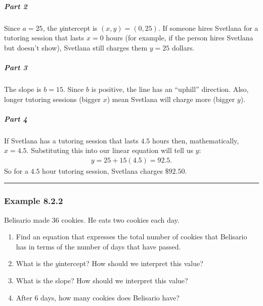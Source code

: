 \documentclass[letterpaper,10pt,english]{jupyterBook}
\begin{document}
\subparagraph{Part 2}
\label{\detokenize{Ch8 Correlation and Linear Regression/8.2 Linear Equations:part-2}}
\sphinxAtStartPar
Since \(a = 25\), the \(y\)\sphinxhyphen{}intercept is \((x, y) = (0, 25)\). If someone hires Svetlana for a tutoring session that lasts \(x = 0\) hours (for example, if the person hires Svetlana but doesn’t show), Svetlana still charges them \(y = 25\) dollars.


\subparagraph{Part 3}
\label{\detokenize{Ch8 Correlation and Linear Regression/8.2 Linear Equations:part-3}}
\sphinxAtStartPar
The slope is \(b = 15\). Since \(b\) is positive, the line has an “uphill” direction. Also, longer tutoring sessions (bigger \(x\)) mean Svetlana will charge more (bigger \(y\)).


\subparagraph{Part 4}
\label{\detokenize{Ch8 Correlation and Linear Regression/8.2 Linear Equations:part-4}}
\sphinxAtStartPar
If Svetlana has a tutoring session that lasts \(4.5\) hours then, mathematically, \(x = 4.5\). Substituting this into our linear equation will tell us \(y\):
\begin{equation*}
\begin{split} y = 25 + 15(4.5) = 92.5. \end{split}
\end{equation*}
\sphinxAtStartPar
So for a \(4.5\) hour tutoring session, Svetlana charges \(\$92.50\).


\bigskip\hrule\bigskip



\subsubsection{Example 8.2.2}
\label{\detokenize{Ch8 Correlation and Linear Regression/8.2 Linear Equations:example-8-2-2}}
\sphinxAtStartPar
Belisario made \(36\) cookies. He eats two cookies each day.
\begin{enumerate}
%
\item {} 
\sphinxAtStartPar
Find an equation that expresses the total number of cookies that Belisario has in terms of the number of days that have passed.

\item {} 
\sphinxAtStartPar
What is the \(y\)\sphinxhyphen{}intercept? How should we interpret this value?

\item {} 
\sphinxAtStartPar
What is the slope? How should we interpret this value?

\item {} 
\sphinxAtStartPar
After \(6\) days, how many cookies does Belisario have?

\end{enumerate}
\end{document}
